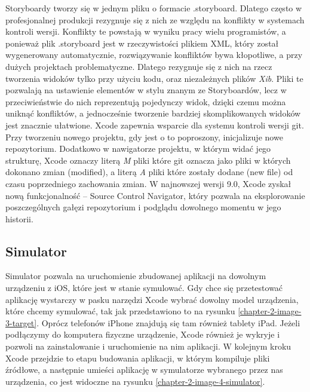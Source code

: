 Storyboardy tworzy się w jednym pliku o formacie .storyboard. Dlatego często w profesjonalnej produkcji rezygnuje się z nich ze względu na konflikty w systemach kontroli wersji. Konflikty te powstają w wyniku pracy wielu programistów, a ponieważ plik .storyboard jest w rzeczywistości plikiem XML, który został wygenerowany automatycznie, rozwiązywanie konfliktów bywa kłopotliwe, a przy dużych projektach problematyczne. Dlatego rezygnuje się z nich na rzecz tworzenia widoków tylko przy użyciu kodu, oraz niezależnych plików \textit{Xib}. Pliki te pozwalają na ustawienie elementów w stylu znanym ze Storyboardów, lecz w przeciwieństwie do nich reprezentują pojedynczy widok, dzięki czemu można uniknąć konfliktów, a jednocześnie tworzenie bardziej skomplikowanych widoków jest znacznie ułatwione. Xcode zapewnia wsparcie dla systemu kontroli wersji git. Przy tworzeniu nowego projektu, gdy jest o to poproszony, inicjalizuje nowe repozytorium. Dodatkowo w nawigatorze projektu, w którym widać jego strukturę, Xcode oznaczy literą \textit{M} pliki które git oznacza jako pliki w których dokonano zmian (modified), a literą \textit{A} pliki które zostały dodane (new file) od czasu poprzedniego zachowania zmian.
W najnowszej wersji 9.0, Xcode zyskał nową funkcjonalność -- Source Control Navigator, który pozwala na eksplorowanie poszczególnych gałęzi repozytorium i podglądu dowolnego momentu w jego historii.

\subsection{Simulator}

Simulator pozwala na uruchomienie zbudowanej aplikacji na dowolnym urządzeniu z iOS, które jest w stanie symulować. Gdy chce się przetestować aplikację wystarczy w pasku narzędzi Xcode wybrać dowolny model urządzenia, które chcemy symulować, tak jak przedstawiono to na rysunku \ref{chapter-2-image-3-target}. Oprócz telefonów iPhone znajdują się tam również tablety iPad. Jeżeli podłączymy do komputera fizyczne urządzenie, Xcode również je wykryje i pozwoli na zainstalowanie i uruchomienie na nim aplikacji. W kolejnym kroku Xcode przejdzie to etapu budowania aplikacji, w którym kompiluje pliki źródłowe, a następnie umieści aplikację w symulatorze wybranego przez nas urządzenia, co jest widoczne na rysunku \ref{chapter-2-image-4-simulator}.

